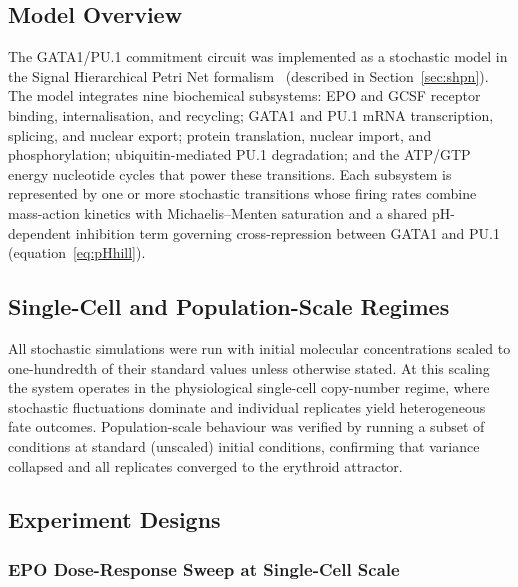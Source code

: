 
\subsection{Model Overview}

The GATA1/PU.1 commitment circuit was implemented as a stochastic model in the
Signal Hierarchical Petri Net formalism~\cite{shypn2026} (described in
Section~\ref{sec:shpn}). The model integrates nine biochemical subsystems: EPO
and GCSF receptor binding, internalisation, and recycling; GATA1 and PU.1 mRNA
transcription, splicing, and nuclear export; protein translation, nuclear import,
and phosphorylation; ubiquitin-mediated PU.1 degradation; and the ATP/GTP energy
nucleotide cycles that power these transitions. Each subsystem is represented by
one or more stochastic transitions whose firing rates combine mass-action kinetics
with Michaelis--Menten saturation and a shared pH-dependent inhibition term
governing cross-repression between GATA1 and PU.1 (equation~\ref{eq:pHhill}).

\subsection{Single-Cell and Population-Scale Regimes}

All stochastic simulations were run with initial molecular concentrations scaled
to one-hundredth of their standard values unless otherwise stated. At this scaling
the system operates in the physiological single-cell copy-number regime, where
stochastic fluctuations dominate and individual replicates yield heterogeneous
fate outcomes. Population-scale behaviour was verified by running a subset of
conditions at standard (unscaled) initial conditions, confirming that variance
collapsed and all replicates converged to the erythroid attractor.

\subsection{Experiment Designs}

\subsubsection*{EPO Dose-Response Sweep at Single-Cell Scale}

